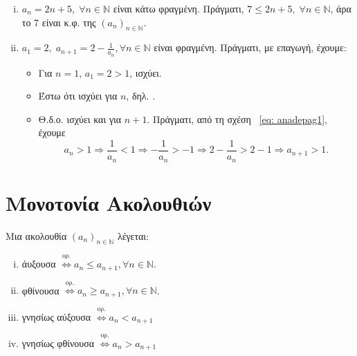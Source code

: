 \documentclass[main.tex]{subfiles}
\begin{document}
\begin{examples}
\begin{enumerate}[i)]
      \item $ a_{n}= 2n+5, \; \forall n \in \mathbb{N} $ είναι κάτω φραγμένη.
          Πράγματι, $ 7 \leq 2n+5, \; \forall n \in \mathbb{N} $, άρα το 
          7 είναι κ.φ. της $ (a_{n} )_{n \in \mathbb{N}} $.

      \item $ a_{1}=2, \; a_{n+1}=2 - \frac{1}{a_{n}}, \forall n \in \mathbb{N}$
          είναι φραγμένη. Πράγματι, με επαγωγή, έχουμε:
          \begin{itemize}
              \item Για $ n=1 $, $ a_{1}=2>1 $, ισχύει. 
              \item Έστω ότι ισχύει για $n$, δηλ. .
              \item Θ.δ.ο. ισχύει και για $ n+1 $. Πράγματι, από τη σχέση~
                  \eqref{eq: anadepag1}, έχουμε
\[
    a_{n}>1 \Rightarrow \frac{1}{a_{n}} < 1 \Rightarrow - \frac{1}{a_{n}} > 
    -1 \Rightarrow 2 - \frac{1}{a_{n}} > 2-1 \Rightarrow a_{n+1} > 1.
 \] 
          \end{itemize}
    \end{enumerate}
\end{examples}

\section{Μονοτονία Ακολουθιών}

\begin{dfn}
    Μια ακολουθία $ (a_{n})_{n \in \mathbb{N}} $ λέγεται:
    \begin{enumerate}[i)]
        \item άυξουσα $ \overset{\text{ορ.}}{\Leftrightarrow} a_{n} \leq 
            a_{n+1}, \forall n \in \mathbb{N}  $.
        \item φθίνουσα $ \overset{\text{ορ.}}{\Leftrightarrow} a_{n} \geq 
            a_{n+1}, \forall n \in \mathbb{N}  $.
        \item γνησίως αύξουσα $ \overset{\text{ορ.}}{\Leftrightarrow} a_{n} 
            < a_{n+1}$
        \item γνησίως φθίνουσα $ \overset{\text{ορ.}}{\Leftrightarrow} a_{n} 
            > a_{n+1}$
    \end{enumerate}
\end{dfn}
\end{document}
